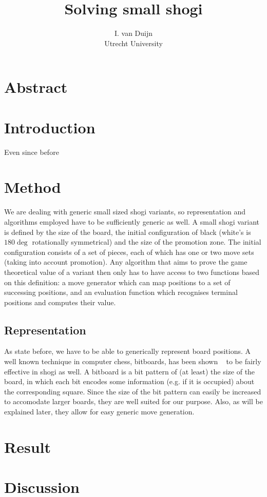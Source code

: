 \documentclass{article}
\title{Solving small shogi}
\author{I. van Duijn \\ Utrecht University}
\begin{document}
\maketitle

\section{Abstract}

\section{Introduction}
Even since before

\section{Method}
We are dealing with generic small sized shogi variants, so representation and algorithms employed have to be sufficiently generic as well.
A small shogi variant is defined by the size of the board, the initial configuration of black (white's is $180\deg$ rotationally symmetrical) and
the size of the promotion zone. The initial configuration consists of a set of pieces, each of which has one or two move sets (taking into account
promotion). Any algorithm that aims to prove the game theoretical value of a variant then only has to have access to two functions based on this
definition: a move generator which can map positions to a set of successing positions, and an evaluation function which recognises terminal
positions and computes their value.

\subsection{Representation}
As state before, we have to be able to generically represent board positions. A well known technique in computer chess, bitboards, has been
shown ~\cite{grimbergen2007using} to be fairly effective in shogi as well. A bitboard is a bit pattern of (at least) the size of the board,
in which each bit encodes some information (e.g. if it is occupied) about the corresponding square. Since the size of the bit pattern can
easily be increased to accomodate larger boards, they are well suited for our purpose. Also, as will be explained later, they allow for easy
generic move generation.




\section{Result}


\section{Discussion}
\end{document}
